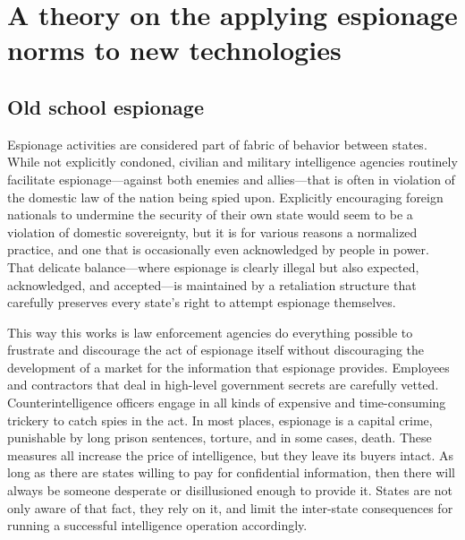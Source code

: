 \documentclass{report}
\begin{document}
\section{A theory on the applying espionage norms to new technologies}
\subsection{Old school espionage}
Espionage activities are considered part of fabric of behavior between states. While not explicitly condoned, civilian and military intelligence agencies routinely facilitate espionage---against both enemies and allies---that is often in violation of the domestic law of the nation being spied upon. Explicitly encouraging foreign nationals to undermine the security of their own state would seem to be a violation of domestic sovereignty, but it is for various reasons a normalized practice, and one that is occasionally even acknowledged by people in power. That delicate balance---where espionage is clearly illegal but also expected, acknowledged, and accepted---is maintained by a retaliation structure that carefully preserves every state's right to attempt espionage themselves.

This way this works is law enforcement agencies do everything possible to frustrate and discourage the act of espionage itself without discouraging the development of a market for the information that espionage provides. Employees and contractors that deal in high-level government secrets are carefully vetted. Counterintelligence officers engage in all kinds of expensive and time-consuming trickery to catch spies in the act. In most places, espionage is a capital crime, punishable by long prison sentences, torture, and in some cases, death. These measures all increase the price of intelligence, but they leave its buyers intact. As long as there are states willing to pay for confidential information, then there will always be someone desperate or disillusioned enough to provide it. States are not only aware of that fact, they rely on it, and limit the inter-state consequences for running a successful intelligence operation accordingly.
\end{document}
